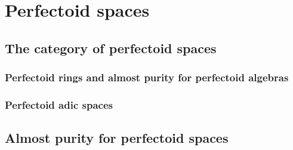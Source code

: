 \section{Perfectoid spaces}
    \subsection{The category of perfectoid spaces}
        \subsubsection{Perfectoid rings and almost purity for perfectoid algebras}
        
        \subsubsection{Perfectoid adic spaces}
        
    \subsection{Almost purity for perfectoid spaces}
